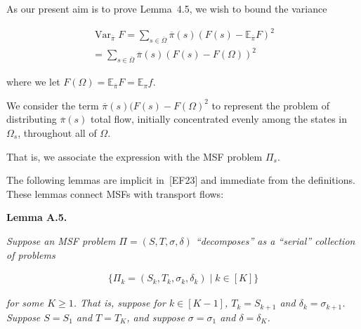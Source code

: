 As our present aim is to prove Lemma 4.5, we wish to bound the variance\par


\[\begin{gathered}
\displaystyle\operatorname{Var}_{\overline{\pi}}F \displaystyle=\sum_{s\in\overline{\Omega}}\overline{\pi}(s)(F(s)-\mathbb{E}_{\overline{\pi}}F)^{2} \\
\displaystyle=\sum_{s\in\overline{\Omega}}\overline{\pi}(s)(F(s)-F(\Omega))^{2}
\end{gathered}\]


where we let $F(\Omega)=\mathbb{E}_{\overline{\pi}}F=\mathbb{E}_{\pi}f$.\par




We consider the term $\overline{\pi}(s)(F(s)-F(\Omega)^{2}$ to represent the problem of distributing $\overline{\pi}(s)$ total flow, initially concentrated evenly among the states in $\Omega_{s}$, throughout all of $\Omega$.\par




That is, we associate the expression with the MSF problem $\Pi_{s}$.\par




The following lemmas are implicit in [EF23] and immediate from the definitions. These lemmas connect MSFs with transport flows:\par





\par\medskip\noindent\textbf{\textbf{Lemma A.5}\textbf{.}}\par



\emph{Suppose an MSF problem $\Pi=(S,T,\sigma,\delta)$ “decomposes” as a “serial” collection of problems}\par


\[\begin{gathered}
\{\Pi_{k}=(S_{k},T_{k},\sigma_{k},\delta_{k})\mid k\in[K]\}
\end{gathered}\]


\emph{for some $K\geq 1$. That is, suppose for $k\in[K-1]$, $T_{k}=S_{k+1}$ and $\delta_{k}=\sigma_{k+1}$. Suppose $S=S_{1}$ and $T=T_{K}$, and suppose $\sigma=\sigma_{1}$ and $\delta=\delta_{K}$.}\par




